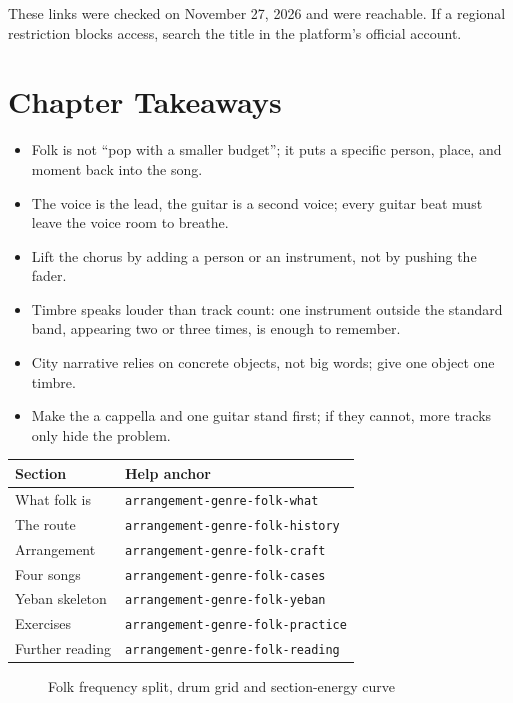 These links were checked on November 27, 2026 and were reachable. If a regional restriction blocks access, search the title in the platform's official account.

\section{Chapter Takeaways}
\label{sec:folk-takeaways}

\begin{itemize}
\item Folk is not ``pop with a smaller budget''; it puts a specific person, place, and moment back into the song.
\item The voice is the lead, the guitar is a second voice; every guitar beat must leave the voice room to breathe.
\item Lift the chorus by adding a person or an instrument, not by pushing the fader.
\item Timbre speaks louder than track count: one instrument outside the standard band, appearing two or three times, is enough to remember.
\item City narrative relies on concrete objects, not big words; give one object one timbre.
\item Make the a cappella and one guitar stand first; if they cannot, more tracks only hide the problem.
\end{itemize}

\begin{helpmapping}
\begin{longtable}{p{}p{}}
\toprule
Section & Help anchor \\
\midrule
What folk is & \texttt{arrangement-genre-folk-what} \\
The route & \texttt{arrangement-genre-folk-history} \\
Arrangement & \texttt{arrangement-genre-folk-craft} \\
Four songs & \texttt{arrangement-genre-folk-cases} \\
Yeban skeleton & \texttt{arrangement-genre-folk-yeban} \\
Exercises & \texttt{arrangement-genre-folk-practice} \\
Further reading & \texttt{arrangement-genre-folk-reading} \\
\bottomrule
\end{longtable}
\end{helpmapping}

\begin{figure}[htbp]\centering
{}
\caption{Folk frequency split, drum grid and section-energy curve}
\end{figure}
